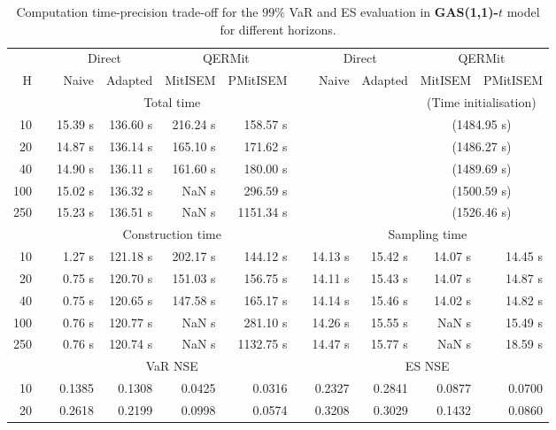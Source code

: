 \footnotesize{  
{ \renewcommand{\arraystretch}{1.3} 
\begin{longtable}{rr rrrr r rrrr}  
\caption{Computation time-precision trade-off for the  $99\%$ VaR and ES evaluation in \textbf{GAS(1,1)-$t$} model for different horizons.} 
\label{tab:time_precision_t_gas} \\ 
 & & \multicolumn{2}{c}{Direct} & \multicolumn{2}{c}{QERMit}&  & \multicolumn{2}{c}{Direct} & \multicolumn{2}{c}{QERMit} \\ \cline{3-6} \cline{8-11} 
 H & & Naive & Adapted & MitISEM & PMitISEM & & Naive & Adapted & MitISEM & PMitISEM \\ \hline 
 & & \multicolumn{4}{c}{Total time} & & && \multicolumn{2}{c}{(Time initialisation)} \\ \cline{3-6} \cline{10-11}
10 & & 15.39 s & 136.60 s & 216.24 s & 158.57 s &&&& \multicolumn{2}{c}{(1484.95 s)} \\ 
20 & & 14.87 s & 136.14 s & 165.10 s & 171.62 s &&&& \multicolumn{2}{c}{(1486.27 s)} \\ 
40 & & 14.90 s & 136.11 s & 161.60 s & 180.00 s &&&& \multicolumn{2}{c}{(1489.69 s)} \\ 
100 & & 15.02 s & 136.32 s &  NaN s & 296.59 s &&&& \multicolumn{2}{c}{(1500.59 s)} \\ 
250 & & 15.23 s & 136.51 s &  NaN s & 1151.34 s &&&& \multicolumn{2}{c}{(1526.46 s)} \\ 
\hline 
 & & \multicolumn{4}{c}{Construction time} & & \multicolumn{4}{c}{ Sampling time} \\ \cline{3-6}  \cline{8-11}
10 & & 1.27 s & 121.18 s & 202.17 s & 144.12 s && 14.13 s & 15.42 s & 14.07 s & 14.45 s \\ 
20 & & 0.75 s & 120.70 s & 151.03 s & 156.75 s && 14.11 s & 15.43 s & 14.07 s & 14.87 s \\ 
40 & & 0.75 s & 120.65 s & 147.58 s & 165.17 s && 14.14 s & 15.46 s & 14.02 s & 14.82 s \\ 
100 & & 0.76 s & 120.77 s &  NaN s & 281.10 s && 14.26 s & 15.55 s &  NaN s & 15.49 s \\ 
250 & & 0.76 s & 120.74 s &  NaN s & 1132.75 s && 14.47 s & 15.77 s &  NaN s & 18.59 s \\ 
\hline 
 & & \multicolumn{4}{c}{VaR NSE} &&  \multicolumn{4}{c}{ES NSE} \\ \cline{3-6}  \cline{8-11}
10 && 0.1385  & 0.1308  & 0.0425 & 0.0316 && 0.2327  & 0.2841  & 0.0877 & 0.0700 \\ 
20 && 0.2618  & 0.2199  & 0.0998 & 0.0574 && 0.3208  & 0.3029  & 0.1432 & 0.0860 \\ 

\end{longtable}}}
